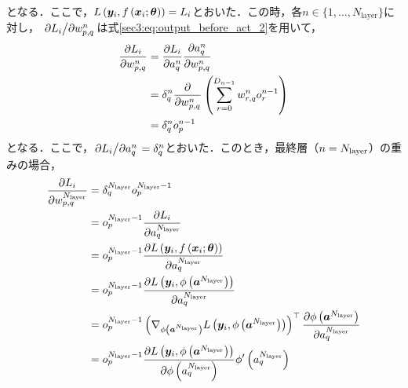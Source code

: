となる．ここで，$L\left(\bm{y}_{i}, f\left(\bm{x}_{i}; \bm{\theta}\right)\right) = L_{i}$とおいた．この時，各$n \in \{1, \ldots, N_{\text{layer}}\}$に対し，
$\pdv*{L_{i}}{w_{p, q}^{n}}$は式\eqref{sec3:eq:output_before_act_2}を用いて，
\begin{align}
    \pdv{L_{i}}{w_{p, q}^{n}} & = \pdv{L_{i}}{a_{q}^{n}} \pdv{a_{q}^{n}}{w_{p, q}^{n}}                \\
                                                     & = \delta_{q}^{n} \pdv{w_{p, q}^{n}} \left(\sum_{r = 0}^{D_{n - 1}} w_{r, q}^{n} o_{r}^{n - 1}\right) \\
                                                     & = \delta_{q}^{n} o_{p}^{n - 1}
\end{align}
となる．ここで，$\pdv*{L_{i}}{a_{q}^{n}} = \delta_{q}^{n}$とおいた．このとき，最終層（$n = N_{\text{layer}}$）の重みの場合，
\begin{align}
    \pdv{L_{i}}{w_{p, q}^{N_{\text{layer}}}} & = \delta_{q}^{N_{\text{layer}}} o_{p}^{N_{\text{layer}} - 1}                                                                                                                                                                                                           \\
                                                               & = o_{p}^{N_{\text{layer}} - 1} \pdv{L_{i}}{a_{q}^{N_{\text{layer}}}}                                                                                                                                                                                                   \\
                                                               & = o_{p}^{N_{\text{layer}} - 1} \pdv{L\left(\bm{y}_{i}, f\left(\bm{x}_{i}; \bm{\theta}\right)\right)}{a_{q}^{N_{\text{layer}}}}                                                                                           \\
                                                               & = o_{p}^{N_{\text{layer}} - 1} \pdv{L\left(\bm{y}_{i}, \phi\left(\bm{a}^{N_{\text{layer}}}\right)\right)}{a_{q}^{N_{\text{layer}}}}                                                                                                          \\
                                                               & = o_{p}^{N_{\text{layer}} - 1} \left(\nabla_{\phi\left(\bm{a}^{N_{\text{layer}}}\right)} L\left(\bm{y}_{i}, \phi\left(\bm{a}^{N_{\text{layer}}}\right)\right)\right)^\top \pdv{\phi\left(\bm{a}^{N_{\text{layer}}}\right)}{a_{q}^{N_{\text{layer}}}} \\
                                                               & = o_{p}^{N_{\text{layer}} - 1} \pdv{L\left(\bm{y}_{i}, \phi\left(\bm{a}^{N_{\text{layer}}}\right)\right)}{\phi\left(a_{q}^{N_{\text{layer}}}\right)} \phi'\left(a_{q}^{N_{\text{layer}}}\right)
\end{align}
